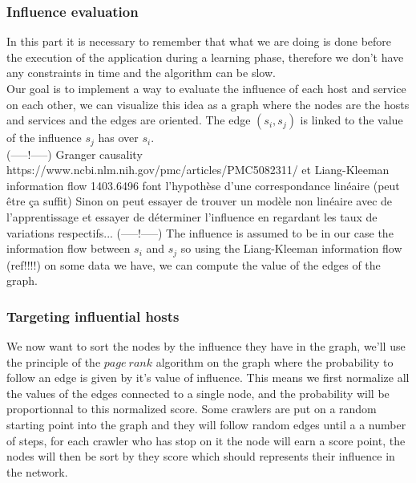 \documentclass[10pt,a4paper,oneside]{article}
\begin{document}
\begin{multicols}{2}
\subsubsection{Influence evaluation}
In this part it is necessary to remember that what we are doing is done before the execution of the application during a learning phase, therefore we don't have any constraints in time and the algorithm can be slow.
\\
Our goal is to implement a way to evaluate the influence of each host and service on each other, we can visualize this idea as a graph where the nodes are the hosts and services and the edges are oriented. The edge $(s_i,s_j)$ is linked to the value of the influence $s_j$ has over $s_i$.
\\
(-----!-----)
Granger causality https://www.ncbi.nlm.nih.gov/pmc/articles/PMC5082311/ et Liang-Kleeman information flow 1403.6496 font l'hypothèse d'une correspondance linéaire (peut être ça suffit)
Sinon on peut essayer de trouver un modèle non linéaire avec de l'apprentissage et essayer de déterminer l'influence en regardant les taux de variations respectifs...
(-----!-----)
The influence is assumed to be in our case the information flow between $s_i$ and $s_j$ so using the Liang-Kleeman information flow (ref!!!!) on some data we have, we can compute the value of the edges of the graph.
\subsubsection{Targeting influential hosts}
We now want to sort the nodes by the influence they have in the graph, we'll use the principle of the $page~rank$ algorithm on the graph where the probability to follow an edge is given by it's value of influence. This means we first normalize all the values of the edges connected to a single node, and the probability will be proportionnal to this normalized score.
Some crawlers are put on a random starting point into the graph and they will follow random edges until a a number of steps, for each crawler who has stop on it the node will earn a score point, the nodes will then be sort by they score which should represents their influence in the network.
\end{multicols}

\vspace{0.8cm}
\end{document}
